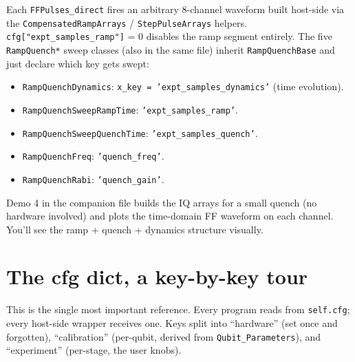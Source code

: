 \documentclass[11pt,letterpaper]{article}
\begin{document}
Each \texttt{FFPulses\_direct} fires an arbitrary 8-channel waveform built host-side via the \texttt{CompensatedRampArrays} / \texttt{StepPulseArrays} helpers. \texttt{cfg["expt\_samples\_ramp"]} = 0 disables the ramp segment entirely. The five \texttt{RampQuench*} sweep classes (also in the same file) inherit \texttt{RampQuenchBase} and just declare which key gets swept:
\begin{itemize}[leftmargin=*]
  \item \texttt{RampQuenchDynamics}: \texttt{x\_key = 'expt\_samples\_dynamics'} (time evolution).
  \item \texttt{RampQuenchSweepRampTime}: \texttt{'expt\_samples\_ramp'}.
  \item \texttt{RampQuenchSweepQuenchTime}: \texttt{'expt\_samples\_quench'}.
  \item \texttt{RampQuenchFreq}: \texttt{'quench\_freq'}.
  \item \texttt{RampQuenchRabi}: \texttt{'quench\_gain'}.
\end{itemize}

\begin{tryit}
Demo 4 in the companion file builds the IQ arrays for a small quench (no hardware involved) and plots the time-domain FF waveform on each channel. You'll see the ramp + quench + dynamics structure visually.
\end{tryit}

\section{The cfg dict, a key-by-key tour}\label{sec:cfgref}
This is the single most important reference. Every program reads from \texttt{self.cfg}; every host-side wrapper receives one. Keys split into ``hardware'' (set once and forgotten), ``calibration'' (per-qubit, derived from \texttt{Qubit\_Parameters}), and ``experiment'' (per-stage, the user knobs).
\end{document}

